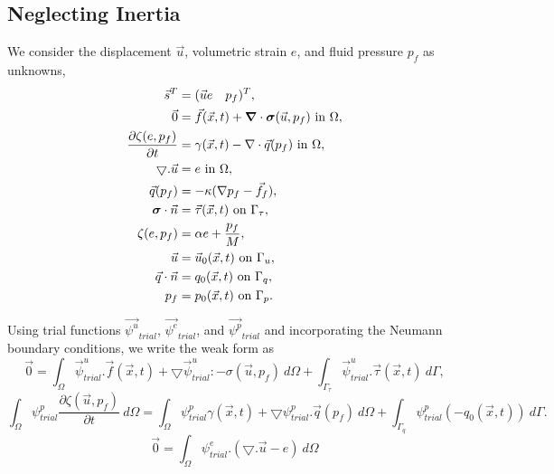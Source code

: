 \subsection{Neglecting Inertia}

We consider the displacement $\vec{u}$, volumetric strain $e$, and fluid pressure $p_f$ as unknowns,
\begin{align}
  \vec{s}^T &= (\vec{u} e \quad p_f)^T, \\
%
  \vec{0} &= \vec{f}(\vec{x},t) + \tensor{\nabla} \cdot \tensor{\sigma}(\vec{u},p_f) 
\text{ in }\Omega, \\
%
  \frac{\partial \zeta(e,p_f)}{\partial t} &= \gamma(\vec{x},t) - \nabla \cdot \vec{q}
(p_f) \text{ in }
\Omega, \\
%
\bigtriangledown . \vec{u} &= e \text{ in } \Omega, \\
%
  \vec{q}(p_f) &= -\kappa (\nabla p_f - \vec{f}_f), \\
%
  \tensor{\sigma} \cdot \vec{n} &= \vec{\tau}(\vec{x},t) \text{ on }\Gamma_\tau, \\
%
  \zeta(e,p_f) &= \alpha e + \frac{p_f}{M}, \\
%
  \vec{u} &= \vec{u}_0(\vec{x},t) \text{ on }\Gamma_u, \\
%
  \vec{q} \cdot \vec{n} &= q_0(\vec{x},t) \text{ on }\Gamma_q, \\
%
  p_f &= p_0(\vec{x},t) \text{ on }\Gamma_p.
\end{align}

Using trial functions $\vec{\psi^u}_{trial}$, $\vec{\psi^e}_{trial}$, and $\vec{\psi^p}_{trial}$ and incorporating the Neumann boundary conditions, we write the weak form as \\
\begin{equation}
\vec{0} = \int_{\Omega} \vec{\psi}_{trial}^u . \vec{f}(\vec{x},t) + \bigtriangledown \vec{\psi}_{trial}^u : -\sigma(\vec{u},p_f) \ d\Omega + \int_{\Gamma_{\tau}} \vec{\psi}_{trial}^u . \vec{\tau}(\vec{x},t) \ d\Gamma,
\end{equation}
\begin{equation}
\int_{\Omega} \psi_{trial}^p \frac{\partial \zeta (\vec{u},p_f)}{\partial t} \ d\Omega = \int_{\Omega} \psi_{trial}^p \gamma(\vec{x},t) + \bigtriangledown \psi_{trial}^p . \vec{q}(p_f) \ d\Omega + \int_{\Gamma_q} \psi_{trial}^p (-q_0(\vec{x},t)) \ d\Gamma.
\end{equation}
\begin{equation}
\vec{0} = \int_{\Omega} \psi_{trial}^e .(\bigtriangledown . \vec{u} - e) \ d\Omega
\end{equation} \\

